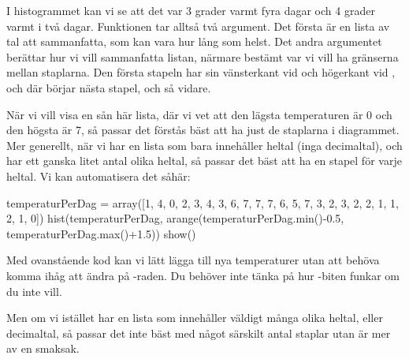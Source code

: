 
I histogrammet kan vi se att det var 3 grader varmt fyra dagar och 4 grader varmt i två dagar. Funktionen  tar alltså två argument. Det första är en lista av tal att sammanfatta, som kan vara hur lång som helst. Det andra argumentet berättar hur vi vill sammanfatta listan, närmare bestämt var vi vill ha gränserna mellan staplarna. Den första stapeln har sin vänsterkant vid  och högerkant vid , och där börjar nästa stapel, och så vidare.

När vi vill visa en sån här lista, där vi vet att den lägsta temperaturen är 0 och den högsta är 7, så passar det förstås bäst att ha just de staplarna i diagrammet. Mer generellt, när vi har en lista som bara innehåller heltal (inga decimaltal), och har ett ganska litet antal olika heltal, så passar det bäst att ha en stapel för varje heltal. Vi kan automatisera det såhär:

\begin{python}[caption={Välja rätt antal staplar automatiskt},label={}]
temperaturPerDag = array([1, 4, 0, 2, 3, 4, 3, 6, 7, 7, 7, 6, 5, 7, 3, 2, 3, 2, 2, 1, 1, 2, 1, 0])
hist(temperaturPerDag, arange(temperaturPerDag.min()-0.5, temperaturPerDag.max()+1.5))
show()
\end{python}

Med ovanstående kod kan vi lätt lägga till nya temperaturer utan att behöva komma ihåg att ändra på -raden. Du behöver inte tänka på hur -biten funkar om du inte vill.

Men om vi istället har en lista som innehåller väldigt många olika heltal, eller decimaltal, så passar det inte bäst med något särskilt antal staplar utan är mer av en smaksak.


